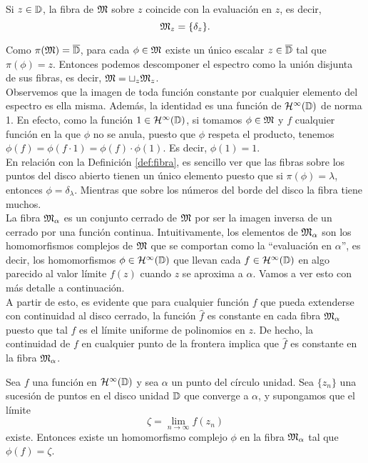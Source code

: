 Si $z \in \mathbb{D}$, la fibra de $\mathfrak{M}$ sobre $z$ coincide con la evaluación en $z$, es decir,
\begin{equation*}
    \mathfrak{M}_z = \{ \delta_z\}.
\end{equation*}

Como $\pi(\mathfrak{M}) = \overline{\mathbb{D}}$, para cada $\phi \in \mathfrak{M}$ existe un único escalar $z \in \overline{\mathbb{D}}$ tal que $\pi(\phi) = z$. Entonces podemos descomponer el espectro como la unión disjunta de sus fibras, es decir, $\mathfrak{M} = \sqcup_{z} \mathfrak{M}_z$. \\

Observemos que la imagen de toda función constante por cualquier elemento del espectro es ella misma. Además, la identidad es una función de $\mathcal{H}^{\infty}(\mathbb{D})$ de norma 1. En efecto, como la función $1 \in \mathcal{H}^{\infty}(\mathbb{D})$, si tomamos $\phi \in \mathfrak{M}$ y $f$ cualquier función en la que $\phi$ no se anula, puesto que $\phi$ respeta el producto, tenemos $\phi(f) = \phi(f \cdot 1) = \phi(f) \cdot \phi(1)$. Es decir, $\phi(1) = 1$. \\

En relación con la Definición \ref{def:fibra}, es sencillo ver que las fibras sobre los puntos del disco abierto tienen un único elemento puesto que si $\pi(\phi)=\lambda$, entonces $\phi = \delta_\lambda$. Mientras que sobre los números del borde del disco la fibra tiene muchos. \\

La fibra $\mathfrak{M}_\alpha$ es un conjunto cerrado de $\mathfrak{M}$ por ser la imagen inversa de un cerrado por una función continua. Intuitivamente, los elementos de $\mathfrak{M}_\alpha$ son los homomorfismos complejos de $\mathfrak{M}$ que se comportan como la ``evaluación en $\alpha$'', es decir, los homomorfismos $\phi \in \mathcal{H}^{\infty}(\mathbb{D})$ que llevan cada $f \in \mathcal{H}^{\infty}(\mathbb{D})$ en algo parecido al valor límite $f(z)$ cuando $z$ se aproxima a $\alpha$. Vamos a ver esto con más detalle a continuación. \\

A partir de esto, es evidente que para cualquier función $f$ que pueda extenderse con continuidad al disco cerrado, la función $\widehat f$ es constante en cada fibra $\mathfrak{M}_\alpha$ puesto que tal $f$ es el límite uniforme de polinomios en $z$. De hecho, la continuidad de $f$ en cualquier punto de la frontera implica que $\widehat f$ es constante en la fibra $\mathfrak{M}_\alpha$. \\

\begin{theorem}
    \label{th:result1}
    Sea $f$ una función en $\mathcal{H}^{\infty}(\mathbb{D})$ y sea $\alpha$ un punto del círculo unidad. Sea $\{z_n\}$ una sucesión de puntos en el disco unidad $\mathbb{D}$ que converge a $\alpha$, y supongamos que el límite
    \begin{equation*}
        \zeta = \lim_{n \to \infty} f(z_n)
    \end{equation*}
    existe. Entonces existe un homomorfismo complejo $\phi$ en la fibra $\mathfrak{M}_\alpha$ tal que $\phi(f) = \zeta$.
\end{theorem}

